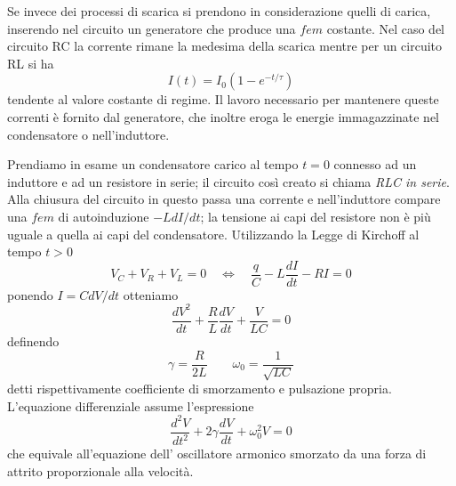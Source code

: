 Se invece dei processi di scarica si prendono in considerazione quelli di carica, inserendo nel circuito un generatore che produce una $fem $ costante. Nel caso del circuito RC la corrente rimane la medesima della scarica mentre per un circuito RL si ha 
\begin{equation*}
	I(t) = I_0(1-e^{-t/\tau})
\end{equation*}
tendente al valore costante di regime. Il lavoro necessario per mantenere queste correnti \`e fornito dal generatore, che inoltre eroga le energie immagazzinate nel condensatore o nell'induttore.
\newline

Prendiamo in esame un condensatore carico al tempo $t = 0$ connesso ad un induttore e ad un resistore in serie; il circuito cos\`i creato si chiama \textit{RLC in serie}. Alla chiusura del circuito in questo passa una corrente e nell'induttore compare una $fem$ di autoinduzione $-L dI/dt$; la tensione ai capi del resistore non \`e pi\`u uguale a quella ai capi del condensatore. Utilizzando la Legge di Kirchoff al tempo $t > 0$
\begin{equation*}
	V_C + V_R + V_L = 0  \quad \iff \quad \frac{q}{C} -L \frac{dI}{dt} -RI = 0
\end{equation*}
 ponendo $I = C dV/dt$ otteniamo 
\begin{equation*}
	\frac{dV^2}{dt} + \frac{R}{L}\frac{dV}{dt} + \frac{V}{LC} = 0
\end{equation*}
definendo 
\begin{equation*}
	\gamma  = \frac{R}{2L} \quad \quad \omega_0 = \frac{1}{\sqrt{LC}} 
\end{equation*}
detti rispettivamente coefficiente di smorzamento e pulsazione propria. L'equazione differenziale assume l'espressione 
\begin{equation}
	\frac{d^2V}{dt^2} + 2 \gamma \frac{dV}{dt} + \omega_0^2V = 0 
\end{equation}
che equivale all'equazione dell' oscillatore armonico smorzato da una forza di attrito proporzionale alla velocit\`a. 

